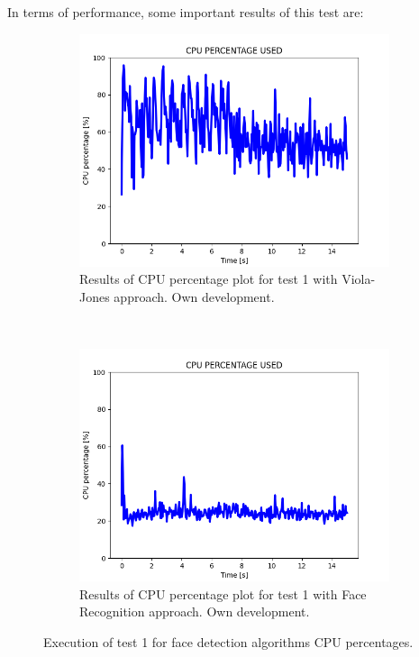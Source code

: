 \documentclass[11pt]{report} %
\begin{document}
In terms of performance, some important results of this test are:

\begin{figure}[H]
	\centering
	\begin{subfigure}{.5\textwidth}
		\centering
		\includegraphics[width=1.0\linewidth]{assets/imgs/computer_vision/face_detection_ex_1_hc_cpu.png}
		\caption{Results of CPU percentage plot for test 1 with Viola-Jones approach. Own development.}
		\label{fig_computer_vision_test_1_cpu_a}
	\end{subfigure}~
	\begin{subfigure}{.5\textwidth}
		\centering
		\includegraphics[width=1.0\linewidth]{assets/imgs/computer_vision/face_detection_ex_1_fr_cpu.png}
		\caption{Results of CPU percentage plot for test 1 with Face Recognition approach. Own development.}
		\label{fig_computer_vision_test_1_cpu_b}
	\end{subfigure}%
	\caption{Execution of test 1 for face detection algorithms CPU percentages.}
	\label{fig_computer_vision_test_1_cpu}
\end{figure}
\end{document}
